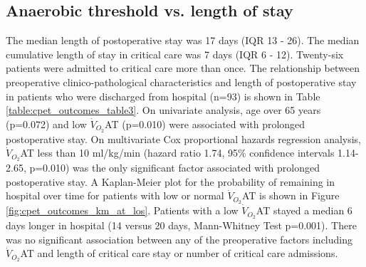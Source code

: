 

\subsection{Anaerobic threshold vs. length of stay}
The median length of postoperative stay was 17 days (IQR 13 - 26). 
The median cumulative length of stay in critical care was 7 days (IQR 6 - 12). 
Twenty-six patients were admitted to critical care more than once. 
The relationship between preoperative clinico-pathological characteristics and length of postoperative stay in patients who were discharged from hospital (n=93) is shown in Table \ref{table:cpet_outcomes_table3}. 
On univariate analysis, age over 65 years (p=0.072) and low $\dot{V}_{O_2}$AT (p=0.010) were associated with prolonged postoperative stay. 
On multivariate Cox proportional hazards regression analysis, $\dot{V}_{O_2}$AT less than 10 ml/kg/min (hazard ratio 1.74, 95\% confidence intervals 1.14-2.65, p=0.010) was the only significant factor associated with prolonged postoperative stay. 
A Kaplan-Meier plot for the probability of remaining in hospital over time for patients with low or normal $\dot{V}_{O_2}$AT is shown in Figure \ref{fig:cpet_outcomes_km_at_los}. 
Patients with a low $\dot{V}_{O_2}$AT stayed a median 6 days longer in hospital (14 versus 20 days, Mann-Whitney Test p=0.001). 
There was no significant association between any of the preoperative factors including $\dot{V}_{O_2}$AT and length of critical care stay or number of critical care admissions.




